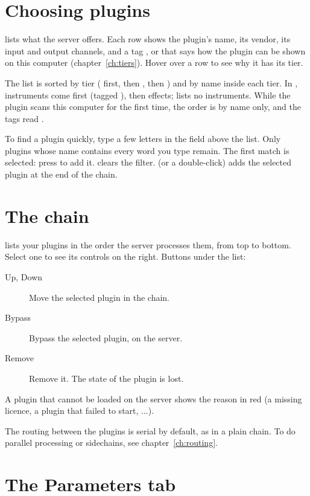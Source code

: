 \section{Choosing plugins}

 lists what the server offers. Each row shows the plugin's
name, its vendor, its input and output channels, and a tag ,
 or  that says how the plugin can be shown on this computer
(chapter~\ref{ch:tiers}). Hover over a row to see why it has its tier.

The list is sorted by tier ( first, then , then ) and
by name inside each tier. In , instruments come
first (tagged ), then effects;  lists no instruments. While the plugin scans this computer for the first
time, the order is by name only, and the tags read .

To find a plugin quickly, type a few letters in the  field above
the list. Only plugins whose name contains every word you type remain. The
first match is selected: press  to add it.  clears the
filter.  (or a double-click) adds the selected plugin at the end of
the chain.

\section{The chain}

 lists your plugins in the order the server processes them, from
top to bottom. Select one to see its controls on the right. Buttons under
the list:

\begin{description}
  \item[Up, Down] Move the selected plugin in the chain.
  \item[Bypass] Bypass the selected plugin, on the server.
  \item[Remove] Remove it. The state of the plugin is lost.
\end{description}

A plugin that cannot be loaded on the server shows the reason in red (a
missing licence, a plugin that failed to start, ...).

The routing between the plugins is serial by default, as in a plain chain. To
do parallel processing or sidechains, see chapter~\ref{ch:routing}.

\section{The Parameters tab}

